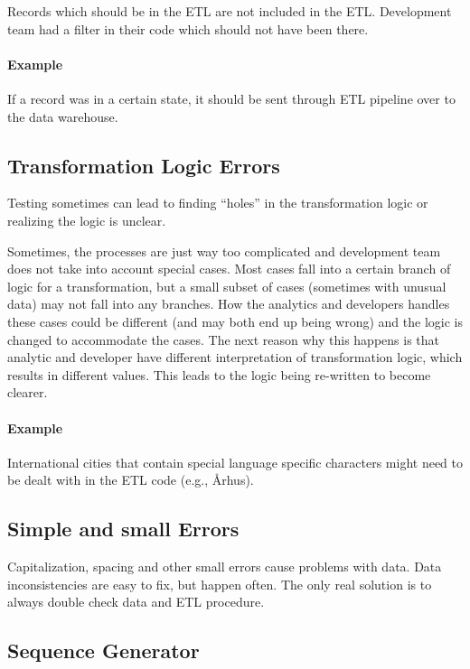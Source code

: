 Records which should be in the ETL are not included in the ETL.
Development team had a filter in their code which should not have been there.

\paragraph*{Example} If a record was in a certain state, it should be sent through ETL pipeline over to the data warehouse.

\subsection*{Transformation Logic Errors}

Testing sometimes can lead to finding \enquote{holes} in the transformation logic or realizing the logic is unclear.

Sometimes, the processes are just way too complicated and development team does not take into account special cases.
Most cases fall into a certain branch of logic for a transformation, but a small subset of cases (sometimes with unusual data) may not fall into any branches.
How the analytics and developers handles these cases could be different (and may both end up being wrong) and the logic is changed to accommodate the cases.
The next reason why this happens is that analytic and developer have different interpretation of transformation logic, which results in different values.
This leads to the logic being re-written to become clearer.

\paragraph*{Example} International cities that contain special language specific characters might need to be dealt with in the ETL code (e.g., Århus).

\subsection*{Simple and small Errors}

Capitalization, spacing and other small errors cause problems with data.
Data inconsistencies are easy to fix, but happen often.
The only real solution is to always double check data and ETL procedure.

\subsection*{Sequence Generator}

